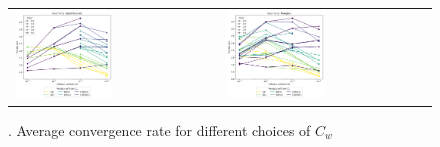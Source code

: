\begin{figure}[h!]
	\centering
	\begin{tabular}{p{} p{}}
	\vspace{0pt} 
	\includegraphics[width=0.49\textwidth]{../figs/parametric/advdiff_2D/ord_quarteroni2_2_4}
	&
	\vspace{0pt} 
	\includegraphics[width=0.49\textwidth]{../figs/parametric/advdiff_2D/ord_quarteroni2_2_3}
	\end{tabular}
	\caption{. Average convergence rate for different choices of $C_w$}
	\label{fig:orders_quarteroni3}
\end{figure}


